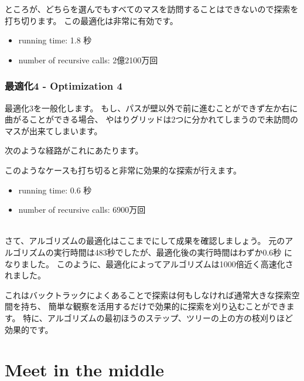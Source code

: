 ところが、どちらを選んでもすべてのマスを訪問することはできないので探索を打ち切ります。
この最適化は非常に有効です。
\begin{itemize}
\item
running time: 1.8 秒
\item
number of recursive calls: 2億2100万回
\end{itemize}

\subsubsection{最適化4 - Optimization 4}

最適化3を一般化します。
もし、パスが壁以外で前に進むことができず左か右に曲がることができる場合、
やはりグリッドは2つに分かれてしまうので未訪問のマスが出来てしまいます。

次のような経路がこれにあたります。
\begin{center}
\end{center}

このようなケースも打ち切ると非常に効果的な探索が行えます。
\begin{itemize}
\item
running time: 0.6 秒
\item
number of recursive calls: 6900万回
\end{itemize}

~\\
さて、アルゴリズムの最適化はここまでにして成果を確認しましょう。
元のアルゴリズムの実行時間は483秒でしたが、最適化後の実行時間はわずか0.6秒 になりました。
このように、最適化によってアルゴリズムは1000倍近く高速化されました。

これはバックトラックによくあることで探索は何もしなければ通常大きな探索空間を持ち、
簡単な観察を活用するだけで効果的に探索を刈り込むことができます。
特に、アルゴリズムの最初ほうのステップ、ツリーの上の方の枝刈りほど効果的です。

\section{Meet in the middle}

